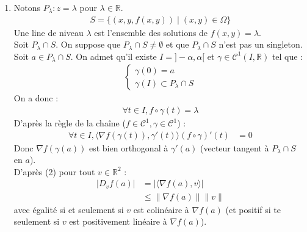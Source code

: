 \documentclass[../main.tex]{subfiles}
\begin{document}
\begin{enumerate}
    \item Notons $P_\lambda: z = \lambda$ pour $\lambda \in \mathbb{R}$. 
    \begin{align*}
        S = \{ (x, y, f(x, y)) \mid (x, y)\in \Omega \}
    \end{align*}
    Une line de niveau $\lambda$ est l'ensemble des solutions de $f(x, y) = \lambda$. \\
    Soit $P_\lambda\cap S$. On suppose que $P_\lambda\cap S \neq \emptyset$ et que $P_\lambda\cap S$ n'est pas un singleton. \\
    Soit $a\in P_\lambda\cap S$. On admet qu'il existe $I = ]-\alpha, \alpha[$ et $\gamma\in \mathcal{C}^1(I, \mathbb{R})$ tel que :
    \begin{align*}
        \begin{cases}
            \gamma(0) = a \\
            \gamma(I) \subset P_\lambda\cap S
        \end{cases}
    \end{align*}
    On a donc : 
    \begin{align*}
        \forall t\in I, f\circ \gamma(t) = \lambda
    \end{align*}
    D'après la règle de la chaîne ($f\in \mathcal{C}^1, \gamma\in \mathcal{C}^1$) : 
    \begin{align*}
        \forall t\in I, \langle \nabla f(\gamma(t)), \gamma'(t)\rangle (f\circ \gamma)'(t) &= 0
    \end{align*}
    Donc $\nabla f(\gamma(a))$ est bien orthogonal à $\gamma'(a)$ (vecteur tangent à $P_\lambda\cap S$ en $a$). \\
    D'après (2) pour tout $v\in \mathbb{R}^2$ : 
    \begin{align*}
        |D_v f(a)| &= |\langle \nabla f(a), v\rangle| \\
        &\leq \| \nabla f(a) \| \|v\|
    \end{align*}
    avec égalité si et seulement si $v$ est colinéaire à $\nabla f(a)$ (et positif si te seulement si $v$ est positivement linéaire à $\nabla f(a)$). 
\end{enumerate}
\end{document}
